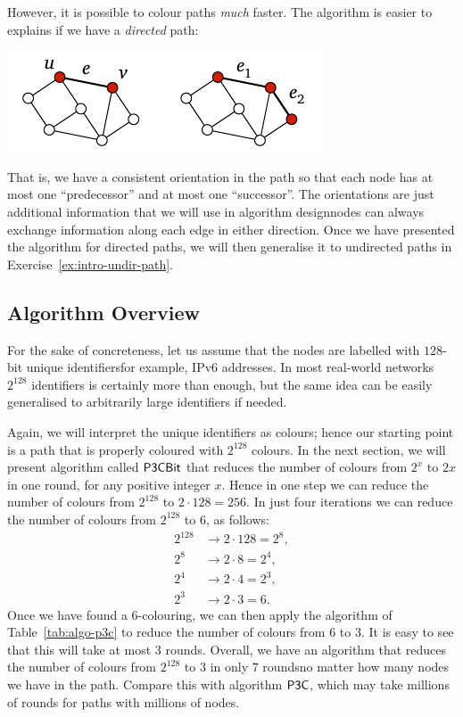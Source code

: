 However, it is possible to colour paths \emph{much} faster. The algorithm is easier to explains if we have a \emph{directed} path:
\begin{center}
    \includegraphics[page=\PIntroIdDir]{figs.pdf}
\end{center}
That is, we have a consistent orientation in the path so that each node has at most one ``predecessor'' and at most one ``successor''. The orientations are just additional information that we will use in algorithm design\mydash nodes can always exchange information along each edge in either direction. Once we have presented the algorithm for directed paths, we will then generalise it to undirected paths in Exercise~\ref{ex:intro-undir-path}.


\subsection{Algorithm Overview}

For the sake of concreteness, let us assume that the nodes are labelled with $128$-bit unique identifiers\mydash for example, IPv6 addresses. In most real-world networks $2^{128}$ identifiers is certainly more than enough, but the same idea can be easily generalised to arbitrarily large identifiers if needed.

Again, we will interpret the unique identifiers as colours; hence our starting point is a path that is properly coloured with $2^{128}$ colours. In the next section, we will present algorithm called $\textup{\sffamily P3CBit}$ that reduces the number of colours from $2^x$ to $2x$ in one round, for any positive integer $x$. Hence in one step we can reduce the number of colours from $2^{128}$ to $2 \cdot 128 = 256$. In just four iterations we can reduce the number of colours from $2^{128}$ to $6$, as follows:
\begin{align*}
    2^{128} &\to 2 \cdot 128 = 2^8, \\
    2^8 &\to 2 \cdot 8 = 2^4, \\
    2^4 &\to 2 \cdot 4 = 2^3, \\
    2^3 &\to 2 \cdot 3 = 6.
\end{align*}
Once we have found a $6$-colouring, we can then apply the algorithm of Table~\ref{tab:algo-p3c} to reduce the number of colours from $6$ to $3$. It is easy to see that this will take at most $3$ rounds. Overall, we have an algorithm that reduces the number of colours from $2^{128}$ to $3$ in only $7$ rounds\mydash no matter how many nodes we have in the path. Compare this with algorithm $\textup{\sffamily P3C}$, which may take millions of rounds for paths with millions of nodes.


